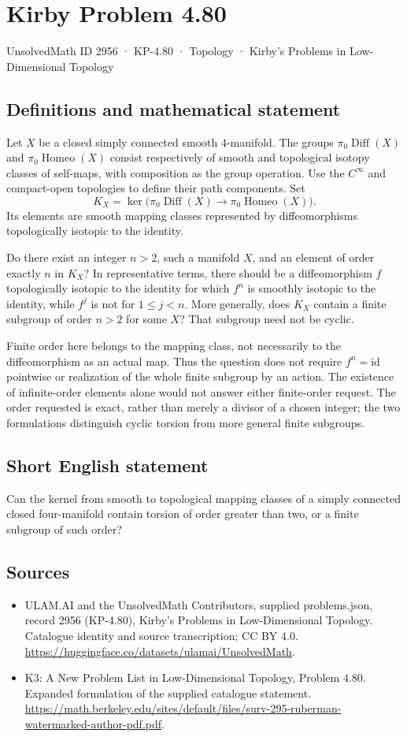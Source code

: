 \documentclass[11pt,a4paper]{article}
\begin{document}
\section*{Kirby Problem 4.80}\label{2956}
{\small UnsolvedMath ID 2956 · KP-4.80 · Topology · Kirby's Problems in Low-Dimensional Topology}
\subsection{Definitions and mathematical statement}
Let $X$ be a closed simply connected smooth $4$-manifold.
The groups $\pi_0\operatorname{Diff}(X)$ and
$\pi_0\operatorname{Homeo}(X)$ consist respectively of smooth
and topological isotopy classes of self-maps, with composition as
the group operation. Use the $C^\infty$ and compact-open
topologies to define their path components. Set
\[
 K_X=\ker\bigl(\pi_0\operatorname{Diff}(X)
           \longrightarrow\pi_0\operatorname{Homeo}(X)\bigr).
\]
Its elements are smooth mapping classes represented by diffeomorphisms
topologically isotopic to the identity.

Do there exist an integer $n>2$, such a manifold $X$, and an
element of order exactly $n$ in $K_X$? In representative terms,
there should be a diffeomorphism $f$ topologically isotopic to the
identity for which $f^n$ is smoothly isotopic to the identity,
while $f^j$ is not for $1\le j<n$.
More generally, does $K_X$ contain a finite subgroup of order
$n>2$ for some $X$? That subgroup need not be cyclic.

Finite order here belongs to the mapping class, not necessarily
to the diffeomorphism as an actual map. Thus the question does
not require $f^n=\mathrm{id}$ pointwise or realization of the
whole finite subgroup by an action. The existence of infinite-order
elements alone would not answer either finite-order request.
The order requested is exact, rather than merely a divisor of a
chosen integer; the two formulations distinguish cyclic torsion
from more general finite subgroups.
\subsection{Short English statement}
Can the kernel from smooth to topological mapping classes of a simply connected closed four-manifold contain torsion of order greater than two, or a finite subgroup of such order?
\subsection{Sources}
\begin{itemize}
\item[S1] ULAM.AI and the UnsolvedMath Contributors, supplied problems.json, record 2956 (KP-4.80), Kirby's Problems in Low-Dimensional Topology. Catalogue identity and source transcription; CC BY 4.0.
\url{https://huggingface.co/datasets/ulamai/UnsolvedMath}.
\item[S2] K3: A New Problem List in Low-Dimensional Topology, Problem 4.80. Expanded formulation of the supplied catalogue statement.
\url{https://math.berkeley.edu/sites/default/files/surv-295-ruberman-watermarked-author-pdf.pdf}.
\end{itemize}
\end{document}
